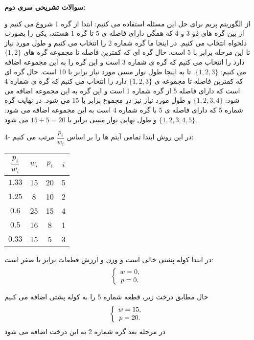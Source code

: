 \documentclass[12pt,fleqn,a4paper]{article}
\begin{document}
\vspace{2cm}
\begin{center}

{\bf سوالات تشریحی سری دوم:}
\end{center}
از الگوریتم پریم برای حل این مسئله استفاده می کنیم: ابتدا از گره 1 شروع می کنیم و از بین گره های 2و 3 و 4 که همگی دارای فاصله ی 5 تا گره 1 هستند، یکی را بصورت دلخواه انتخاب می کنیم. در اینجا ما گره شماره 2 را انتخاب می کنیم و طول مورد نیاز تا این مرحله برابر با 5 است. حال گره ای که کمترین فاصله تا مجموعه گره های 
$\{1,2\}$ 
دارد را انتخاب می کنیم که گره ی شماره 3 است و این گره را به این مجموعه اضافه می کنیم:
$\{1,2,3\}$. 
تا به اینجا طول نوار مسی مورد نیاز برابر با 10 است. حال گره ای که کمترین فاصله تا مجموعه ی 
$\{1,2,3\}$ 
دارد را انتخاب می کنیم که گره ی شماره 4 است که دارای فاصله 5 از گره شماره 1 است و این گره به این مجموعه اضافه می شود:
$\{1,2,3,4\}$ 
و طول مورد نیاز نیز در مجموع برابر با 15 می شود. در نهایت گره  شماره 5 که دارای فاصله ی 5 با گره شماره 4 است به این مجموعه
اضافه می شود:
$\{1,2,3,4,5\}$ 
و طول نهایی نوار مسی برابر با  $15+5=20$ می شود.

4- در این روش ابتدا تمامی آیتم ها را بر اساس  $\dfrac{p_i}{w_i}$ مرتب می کنیم:

\begin{center}
\begin{tabular}{|c|c|c|c|}
\hline \rule[-1ex]{0pt}{2.5ex} $\dfrac{p_i}{w_i}$ & $w_i$ & $p_i$ & $i$ \\ 
\hline \rule[-1ex]{0pt}{2.5ex} $1.33$ & 15 & 20 & 5 \\ 
\hline \rule[-1ex]{0pt}{2.5ex} $1.25$ & 8 & 10 & 2 \\ 
\hline \rule[-1ex]{0pt}{2.5ex} $0.6$ & 25 & 15 & 4 \\ 
\hline \rule[-1ex]{0pt}{2.5ex} $0.5$ & 16 & 8 & 1 \\ 
\hline \rule[-1ex]{0pt}{2.5ex} $0.33$ & 15 & 5 & 3 \\ 
\hline 
\end{tabular}
\end{center}

در ابتدا کوله پشتی خالی است و وزن و ارزش قطعات برابر با صفر است:
\begin{equation*}
	\left\lbrace\begin{array}{c l}w=0,\\p=0.\end{array}\right.
\end{equation*}

حال مطابق درخت زیر، قطعه شماره 5 را به کوله پشتی اضافه می کنیم
\begin{equation*}
	\left\lbrace\begin{array}{c l}w=15,\\p=20.\end{array}\right.
\end{equation*}
در مرحله بعد گره شماره 2 به این درخت اضافه می شود
\end{document}
